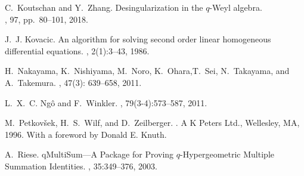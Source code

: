 \documentclass[10pt,a4paper]{article}
\begin{document}
\begin{thebibliography}{10}
C.~Koutschan and Y.~Zhang.
\newblock Desingularization in the $q$-Weyl algebra. \\
, 97, pp.\ 80–101, 2018. 

J.~J. Kovacic.
\newblock An algorithm for solving second order linear homogeneous differential
  equations.
, 2(1):3--43, 1986.

H.~Nakayama, K.~Nishiyama, M.~Noro, K.~Ohara,T.~Sei, N.~Takayama, and A.~Takemura.
, 47(3): 639--658, 2011. 


% 
% 
% 



L.~X.~C. {Ng\^o} and F.~Winkler.
, 79(3-4):573--587, 2011.


M.~Petkov{\v{s}}ek, H.~S.~Wilf, and D.~Zeilberger.
.
\newblock A K Peters Ltd., Wellesley, MA, 1996.
\newblock With a foreword by Donald E. Knuth.

A.~Riese.
\newblock qMultiSum---A Package for Proving $q$-Hypergeometric Multiple Summation Identities.
, 35:349--376, 2003.


\end{thebibliography}
\end{document}
